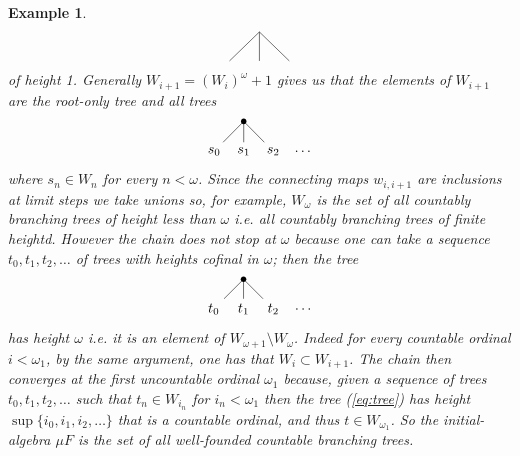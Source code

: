 \documentclass[letterpaper, 11pt, oneside]{memoir}
\theoremstyle{myteo}
\newtheorem{example}[theorem]{Example}
\numberwithin{equation}{section}
\begin{document}
\begin{example}
\begin{equation*}
\begin{tikzpicture}
      \draw (0.75 ,0.75) -- (0, 0);
      \draw (0.75 ,0.75) -- (0.75, 0);
      \draw (0.75 ,0.75) -- (1.5, 0);
    \end{tikzpicture}
  \end{equation*}
  of height 1.
  Generally \(W_{i + 1} = (W_i)^\omega + 1\) gives us that the elements of \(W_{i+1}\) are the root-only tree and all trees
  \begin{equation*}
    \begin{tikzpicture}
      \fill (0.75, 0.75) circle (2pt);
      \node (1) at (0, 0){\(s_0\)};
      \node (2) at (0.75, 0){\(s_1\)};
      \node (3) at (1.5 ,0){\(s_2\)};
      \node (dots) at (2.25, 0){\(\ldots\)};
      
      \draw (0.75 ,0.75) -- (1);
      \draw (0.75 ,0.75) -- (2);
      \draw (0.75 ,0.75) -- (3);
    \end{tikzpicture}
  \end{equation*}
  where \(s_n \in W_n\) for every \(n < \omega\).
  Since the connecting maps \(w_{i, i+1}\) are inclusions at limit steps we take unions so, for example, \(W_\omega\) is the set of all countably branching trees of height less than \(\omega\) i.e. all countably branching trees of finite heightd.
  However the chain does not stop at \(\omega\) because one can take a sequence \(t_0, t_1, t_2, \ldots\) of trees with heights cofinal in \(\omega\); then the tree
  \begin{equation}
    \label{eq:tree}
    \begin{tikzpicture}
      \fill (0.75, 0.75) circle (2pt);
      \node (1) at (0, 0){\(t_0\)};
      \node (2) at (0.75, 0){\(t_1\)};
      \node (3) at (1.5 ,0){\(t_2\)};
      \node (dots) at (2.25, 0){\(\ldots\)};
      
      \draw (0.75 ,0.75) -- (1);
      \draw (0.75 ,0.75) -- (2);
      \draw (0.75 ,0.75) -- (3);
    \end{tikzpicture}
  \end{equation}
  has height \(\omega\) i.e. it is an element of \(W_{\omega+1} \setminus W_\omega\).
  Indeed for every countable ordinal \(i < \omega_1\), by the same argument, one has that \(W_{i} \subset W_{i+1}\).
  The chain then converges at the first uncountable ordinal \(\omega_1\) because, given a sequence of trees \(t_0, t_1, t_2, \ldots\) such that \(t_n \in W_{i_n}\) for \(i_n < \omega_1\) then the tree (\ref{eq:tree}) has height \(\sup\{i_0, i_1, i_2, \ldots\}\) that is a countable ordinal, and thus \(t \in W_{\omega_1}\).
  So the initial-algebra \(\mu F\) is the set of all well-founded countable branching trees.
\end{example}
\end{document}
